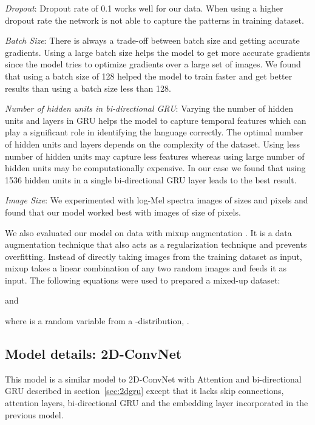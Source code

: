 \documentclass[runningheads]{llncs}
\begin{document}
 \emph{Dropout}: Dropout rate of 0.1 works well for our data. When using a higher dropout rate the network is not able to capture the patterns in training dataset.

 \emph{Batch Size}: There is always a trade-off between batch size and getting accurate gradients. Using a large batch size helps the model to get more accurate gradients since the model tries to optimize gradients over a large set of images. We found that using a batch size of 128 helped the model to train faster and get better results than using a batch size less than 128. 

 \emph{Number of hidden units in bi-directional GRU}: Varying the number of hidden units and layers in GRU helps the model to capture temporal features which can play a significant role in identifying the language correctly. The optimal number of hidden units and layers depends on the complexity of the dataset. Using less number of hidden units may capture less features whereas using large number of hidden units may be computationally expensive. In our case we found that using 1536 hidden units in a single bi-directional GRU layer leads to the best result.

 \emph{Image Size}: We experimented with log-Mel spectra images of sizes  and  pixels and found that our model worked best with images of size of  pixels.

\vspace{5mm}
We also evaluated our model on data with mixup augmentation \cite{zhang2017mixup}. It is a data augmentation technique that also acts as a regularization technique and prevents overfitting. Instead of directly taking images from the training dataset as input, mixup takes a linear combination of any two random images and feeds it as input. The following equations were used to prepared a mixed-up dataset:



and


where  is a random variable from a -distribution, .



\subsection{Model details: 2D-ConvNet}
\label{sec:2dcnn}
This model is a similar model to 2D-ConvNet with Attention and bi-directional GRU described in section~\ref{sec:2dgru} except that it lacks skip connections, attention layers, bi-directional GRU and the embedding layer incorporated in the previous model. 
\end{document}
